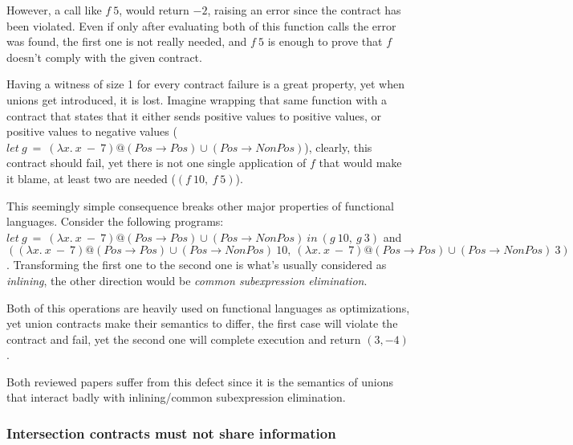 However, a call like $f~5$, would return $-2$, raising an error since
the contract has been violated.
Even if only after evaluating both of this function calls
the error was found, the first one is not really needed, and $f~5$ is enough to
prove that $f$ doesn't comply with the given contract.


Having a witness of size 1 for every contract failure is a great property,
yet when unions get introduced, it is lost.
Imagine wrapping that same function with a contract that states that it either
sends positive values to positive values, or positive values to negative values
($let~g~=~(\lambda x.~x~-~7)@(Pos \rightarrow Pos) \cup (Pos \rightarrow NonPos)$),
clearly, this contract should fail, yet there is not one single application
of $f$ that would make it blame, at least two are needed ($(f~10,~f~5)$).



This seemingly simple consequence breaks other major properties
of functional languages.
Consider the following programs:
$let~g~=~(\lambda x.~x~-~7)@(Pos \rightarrow Pos) \cup (Pos \rightarrow NonPos)~in~(g~10,~g~3)$
and
$((\lambda x.~x~-~7)@(Pos \rightarrow Pos) \cup (Pos \rightarrow NonPos)~10,~(\lambda x.~x~-~7)@(Pos \rightarrow Pos) \cup (Pos \rightarrow NonPos)~3)$.
Transforming the first one to the second one is what's usually considered as \emph{inlining},
the other direction would be \emph{common subexpression elimination}.

Both of this operations are heavily used on functional languages as optimizations,
yet union contracts make their semantics to differ, the first case will violate the contract
and fail, yet the second one will complete execution and return $(3, -4)$.

Both reviewed papers suffer from this defect since it is the semantics
of unions that interact badly with inlining/common subexpression elimination.

\subsubsection*{Intersection contracts must not share information}

